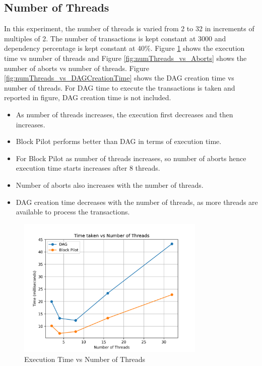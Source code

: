 \documentclass[12pt]{article}
\begin{document}
\subsection{Number of Threads}
In this experiment, the number of threads is varied from 2 to 32 in increments of multiples of 2. 
The number of transactions is kept constant at 3000 and dependency percentage is kept constant at 40\%.
Figure \ref{fig:numThreads_vs_Time} shows the execution time vs number of threads and Figure \ref{fig:numThreads_vs_Aborts} shows the number of aborts vs number of threads.
Figure \ref{fig:numThreads_vs_DAGCreationTime} shows the DAG creation time vs number of threads.
For DAG time to execute the transactions is taken and reported in figure, DAG creation time is not included.
\begin{itemize}
    \item As number of threads increases, the execution first decreases and then increases.
    \item Block Pilot performs better than DAG in terms of execution time.
    \item For Block Pilot as number of threads increases, so number of aborts hence execution time starts increases after 8 threads.
    \item Number of aborts also increases with the number of threads.
    \item DAG creation time decreases with the number of threads, as more threads are available to process the transactions.
\end{itemize}
\begin{figure}[h]
    \centering
    \includegraphics[width=0.8\textwidth]{images/numThreads_vs_Time.png}
    \caption{Execution Time vs Number of Threads}
    \label{fig:numThreads_vs_Time}
\end{figure}
\end{document}
